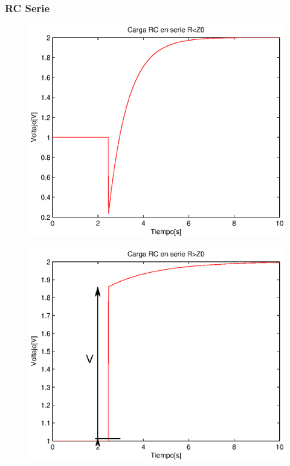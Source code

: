 \documentclass[11pt,onecolumn]{article}
\begin{document}
\subsubsection{RC Serie}


\begin{figure}[H]
\centering
\includegraphics[scale=0.6]{img/RC_serie_rme0.eps}
\label{}
\end{figure}


\begin{figure}[H]
\centering
\includegraphics[scale=0.6]{img/RC_serie_rma0.eps}
\label{}
\end{figure}
\end{document}
